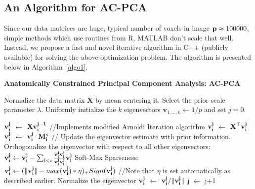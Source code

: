 \documentclass{llncs}
\newcommand{\bs}{\boldsymbol}
\begin{document}
\subsection{An Algorithm for AC-PCA}
Since our data matrices are huge, typical number of voxels in image ${\bf p}\approx 100000$, simple methods which use routines from R, MATLAB don't scale that well. Instead, we propose a fast and novel iterative algorithm in C++ (publicly available) for solving the above optimization problem. The algorithm is presented below in Algorithm~\ref{algo1}.



\begin{algorithm}[htdp]
\small \caption{\bf Anatomically Constrained Principal Component Analysis: AC-PCA}
\label{algo1}
\begin{algorithmic}[1]
\STATE Normalize the data matrix {\bf X} by  mean centering it.
\STATE Select the prior scale parameter $\lambda$.
\STATE Uniformly initialize the $k$ eigenvectors $\bs v_{1,\ldots, k} \gets 1/p$ and set $j=0$.

\STATE ${\bf v_i^{j}}$ $\gets$ ${\bf Xv_i^{j-1}}$ //Implements modified Arnoldi Iteration algorithm
\STATE ${\bf v_i^{j}}$ $\gets$ ${\bf X^{\top}v_i^{j}}$
\STATE ${\bf v_i^{j}}$ $\gets$ ${\bf v_i^{j}}\cdot \bf M^s_i$ // Update the eigenvector estimate with prior information.
\STATE Orthogonalize the eigenvector with respect to all other eigenvectors:\\ ${\bf v_i^{j}} \gets {\bf v_i^{j}} - \sum_{l <i} \frac{\bf v_i^{j} \bf v_l^{j}}{\bf v_l^{j} \bf v_l^{j}}  \bf v_l^{j}$
\STATE Soft-Max Sparseness:  ${\bf v_i^{j}}  \leftarrow (\|{\bf v_i^{j}}\|  - max({\bf v_i^{j}})*\eta)_+ Sign({\bf v_i^{j}})$ //Note that $\eta$ is set automatically as described earlier.
\STATE Normalize the eigenvector ${\bf v_i^{j}}$ $\gets$ ${\bf v_i^{j}}/\|{\bf v_i^{j}}\|$
\ENDFOR
\STATE j $\leftarrow$ j+1
\ENDWHILE
\end{algorithmic}
\end{algorithm}

\iffalse
\end{document}
